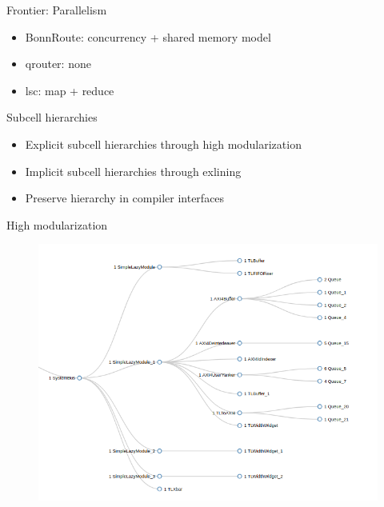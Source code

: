 \documentclass[aspectratio=169]{beamer}
\begin{document}
\begin{frame}{Frontier: Parallelism}
	\begin{itemize}
        \setlength\itemsep{1em}
		\item BonnRoute: concurrency + shared memory model
		\item qrouter: none 
		\item lsc: map + reduce
	\end{itemize}
\end{frame}

\begin{frame}{Subcell hierarchies}
	\begin{itemize}
        \setlength\itemsep{1em}
		\item Explicit subcell hierarchies through high modularization
		\item Implicit subcell hierarchies through exlining
		\item Preserve hierarchy in compiler interfaces
	\end{itemize}
\end{frame}

\begin{frame}{High modularization}
        \begin{figure}
        \centering
        \includegraphics[scale=0.42]{images/SystemBus.png}
        \end{figure}
        \begin{center}
            \href{url}{}
        \end{center}
\end{frame}
\end{document}
